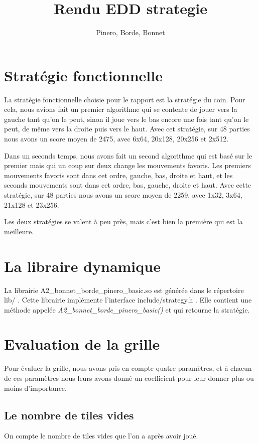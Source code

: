 \documentclass{article}
\title{Rendu EDD strategie}
\author{Pinero, Borde, Bonnet}
\begin{document}
\maketitle
\tableofcontents

\newpage
\section{Stratégie fonctionnelle}
La stratégie fonctionnelle choisie pour le rapport est la stratégie du coin. Pour cela, nous avions fait un premier algorithme qui se contente de jouer vers la gauche tant qu'on le peut, sinon il joue vers le bas encore une fois tant qu'on le peut, de même vers la droite puis vers le haut. Avec cet stratégie, sur 48 parties nous avons un score moyen de 2475, avec 6x64, 20x128, 20x256 et 2x512.

Dans un seconds temps, nous avons fait un second algorithme qui est basé sur le premier mais qui un coup sur deux change les mouvements favoris. Les premiers mouvements favoris sont dans cet ordre, gauche, bas, droite et haut, et les seconds mouvements sont dans cet ordre, bas, gauche, droite et haut. Avec cette stratégie, sur 48 parties nous avons un score moyen de 2259, avec 1x32, 3x64, 21x128 et 23x256.

Les deux stratégies se valent à peu près, mais c'est bien la première qui est la meilleure.

\section{La libraire dynamique}
La librairie A2\_bonnet\_borde\_pinero\_basic.so est gén\'er\'ee dans le r\'epertoire \og lib/ \fg{}. Cette librairie implémente l'interface \og include/strategy.h \fg{}. Elle contient une m\'ethode appel\'ee {\itshape A2\_bonnet\_borde\_pinero\_basic()} et qui retourne la stratégie.

\clearpage
\section{Evaluation de la grille}
\label{eval_grid}
Pour évaluer la grille, nous avons pris en compte quatre paramètres, et à chacun de ces paramètres nous leurs avons donné un coefficient pour leur donner plus ou moins d'importance. 


	\subsection{Le nombre de tiles vides}
	On compte le nombre de tiles vides que l'on a après avoir joué.
\end{document}
